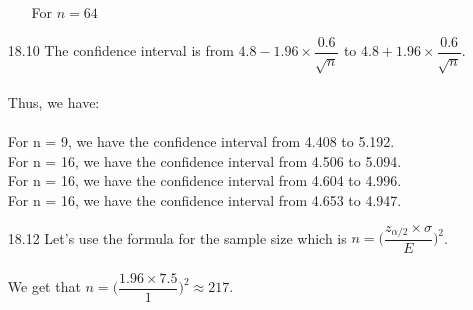 \documentclass[11pt, a4paper]{article}
\begin{document}
\begin{itemize}
\begin{itemize}
For $n = 64$
\begin{center}
    \end{center}
\end{itemize}

\item[]
\item[]

\item[18.10]
The confidence interval is from $4.8 - 1.96 \times \dfrac{0.6}{\sqrt{n}}$
to $4.8 + 1.96 \times \dfrac{0.6}{\sqrt{n}}$.\\\\
Thus, we have:\\\\
For n = 9, we have the confidence interval from 4.408 to 5.192.\\
For n = 16, we have the confidence interval from 4.506 to 5.094.\\
For n = 16, we have the confidence interval from 4.604 to 4.996.\\
For n = 16, we have the confidence interval from 4.653 to 4.947.

\item[]
\item[]

\item[18.12]
Let's use the formula for the sample size which is
$n = \Big(\dfrac{z_{\alpha/2} \times \sigma}{E}\Big)^2$.\\\\
We get that $n = \Big(\dfrac{1.96 \times 7.5}{1}\Big)^2 \approx 217$.


\end{itemize}
\end{document}
